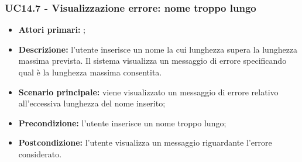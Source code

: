 \subsubsection{UC14.7 - Visualizzazione errore: nome troppo lungo}
\begin{itemize}
	\item \textbf{Attori primari:} \us{};
	\item \textbf{Descrizione:} l’utente inserisce un nome la cui lunghezza supera la lunghezza massima prevista. Il sistema visualizza un messaggio di errore specificando qual è la lunghezza massima consentita. 
	\item \textbf{Scenario principale:} viene visualizzato un messaggio di errore relativo all’eccessiva lunghezza del nome inserito;
	\item \textbf{Precondizione:} l'utente inserisce un nome troppo lungo;
	\item \textbf{Postcondizione:} l’utente visualizza un messaggio riguardante l’errore considerato. 
\end{itemize}